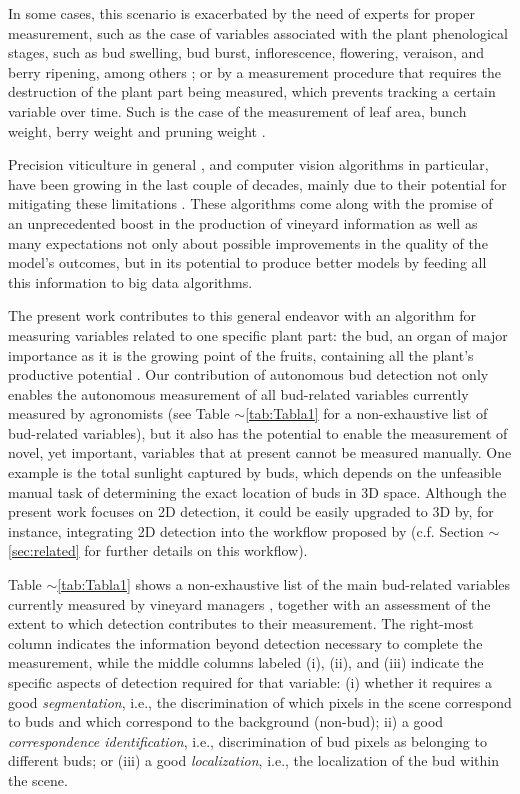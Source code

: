 \documentclass[a4paper,authoryear,review]{elsarticle}
\begin{document}
In some cases, this scenario is exacerbated by the need of experts for proper measurement, such as the case of variables associated with the plant phenological stages, such as bud swelling, bud burst, inflorescence, flowering, veraison, and berry ripening, among others \citep{lorenz1995growth}; or by a measurement procedure that requires the destruction of the plant part being measured, which prevents tracking a certain variable over time. Such is the case of the measurement of leaf area, bunch weight, berry weight and pruning weight \citep{kliewer2005leaf}. 

Precision viticulture in general \citep{bramley2009lessons}, and computer vision algorithms in particular, have been growing in the last couple of decades, mainly due to their potential for mitigating these limitations \citep{seng2018computer, matese2015technology}. These algorithms come along with the promise of an unprecedented boost in the production of vineyard information as well as many expectations not only about possible improvements in the quality of the model’s outcomes, but in its potential to produce better models by feeding all this information to big data algorithms. 

The present work contributes to this general endeavor with an algorithm for measuring variables related to one specific plant part: the bud, an organ of major importance as it is the growing point of the fruits, containing all the plant’s productive potential \citep{may2000bud}. Our contribution of autonomous bud detection not only enables the autonomous measurement of all bud-related variables currently measured by agronomists (see Table $\sim$\ref{tab:Tabla1} for a non-exhaustive list of bud-related variables), but it also has the potential to enable the measurement of novel, yet important, variables that at present cannot be measured manually. One example is the total sunlight captured by buds, which depends on the unfeasible manual task of determining the exact location of buds in 3D space.  Although the present work focuses on 2D detection, it could be easily upgraded to 3D by, for instance, integrating 2D detection into the workflow proposed by \citet{diaz2018grapevine} (c.f. Section $\sim$\ref{sec:related} for further details on this workflow).

Table $\sim$\ref{tab:Tabla1} shows a non-exhaustive list of the main bud-related variables currently measured by vineyard managers \citep{sanchez2005bud, noyce2016basis, collins2020effects}, together with an assessment of the extent to which detection contributes to their measurement. The right-most column indicates the information beyond detection necessary to complete the measurement, while the middle columns labeled (i), (ii), and (iii) indicate the specific aspects of detection required for that variable: (i) whether it requires a good  \emph{segmentation}, i.e., the discrimination of which pixels in the scene correspond to buds and which correspond to the background (non-bud); ii) a good \emph{correspondence identification}, i.e., discrimination of bud pixels as belonging to different buds; or (iii) a good \emph{localization}, i.e., the localization of the bud within the scene.
\end{document}
